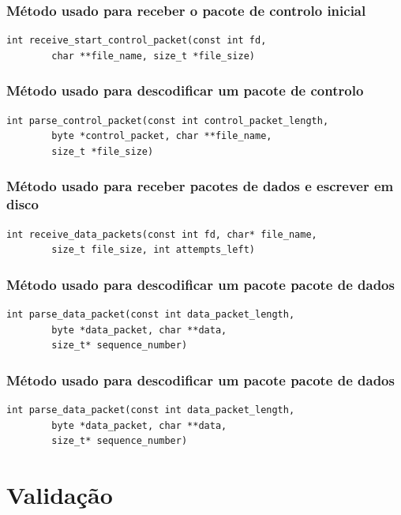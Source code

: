 \documentclass[a4paper,11pt,titlepage]{article}
\begin{document}
\subsubsection*{Método usado para receber o pacote de controlo inicial}
\begin{lstlisting}[style=customc]
int receive_start_control_packet(const int fd,
		char **file_name, size_t *file_size)
\end{lstlisting}

\subsubsection*{Método usado para descodificar um pacote de controlo}
\begin{lstlisting}[style=customc]
int parse_control_packet(const int control_packet_length,
		byte *control_packet, char **file_name,
		size_t *file_size)
\end{lstlisting}

\subsubsection*{Método usado para receber pacotes de dados e escrever em disco}
\begin{lstlisting}[style=customc]
int receive_data_packets(const int fd, char* file_name, 
		size_t file_size, int attempts_left)
\end{lstlisting}

\subsubsection*{Método usado para descodificar um pacote pacote de dados}
\begin{lstlisting}[style=customc]
int parse_data_packet(const int data_packet_length,
		byte *data_packet, char **data,
		size_t* sequence_number)
\end{lstlisting}

\subsubsection*{Método usado para descodificar um pacote pacote de dados}
\begin{lstlisting}[style=customc]
int parse_data_packet(const int data_packet_length,
		byte *data_packet, char **data,
		size_t* sequence_number)
\end{lstlisting}

\section{Validação}

\end{document}
